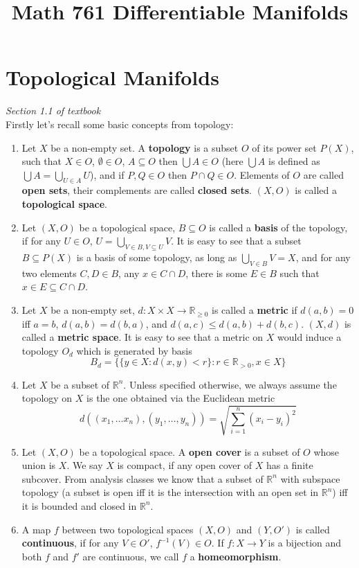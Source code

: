 \documentclass{article}
\title{Math 761 Differentiable Manifolds}
\theoremstyle{definition}
\begin{document}
\maketitle

\tableofcontents

\newpage

\section{Topological Manifolds}

{\em Section 1.1 of textbook}\\

Firstly let's recall some basic concepts from topology:

\begin{enumerate}
    \item Let $X$ be a non-empty set. A {\bf topology} is a subset $O$ of its power set $P(X)$, such that $X\in O$, $\emptyset\in O$, $A\subseteq O$ then $\bigcup A\in O$ (here $\bigcup A$ is defined as $\bigcup A=\bigcup_{U\in A}U$), and if $P, Q\in O$ then $P\cap Q\in O$. Elements of $O$ are called {\bf open sets}, their complements are called {\bf closed sets}. $(X, O)$ is called a {\bf topological space}.
    \item Let $(X, O)$ be a topological space, $B\subseteq O$ is called a {\bf basis} of the topology, if for any $U\in O$, $U=\bigcup_{V\in B, V\subseteq U}V$. It is easy to see that a subset $B\subseteq P(X)$ is a basis of some topology, as long as $\bigcup_{V\in B}V=X$, and for any two elements $C, D\in B$, any $x\in C\cap D$, there is some $E\in B$ such that $x\in E\subseteq C\cap D$.
    \item Let $X$ be a non-empty set, $d: X\times X\rightarrow \mathbb{R}_{\geq 0}$ is called a {\bf metric} if $d(a, b)=0$ iff $a=b$, $d(a, b)=d(b, a)$, and $d(a, c)\leq d(a, b)+d(b, c)$. $(X, d)$ is called a {\bf metric space}. It is easy to see that a metric on $X$ would induce a topology $O_d$ which is generated by basis 
    \[B_d=\{\{y\in X: d(x, y)<r\}: r\in\mathbb{R}_{>0}, x\in X\}\] 
    \item Let $X$ be a subset of $\mathbb{R}^n$. Unless specified otherwise, we always assume the topology on $X$ is the one obtained via the Euclidean metric 
    \[d((x_1, \dots x_n), (y_1, \dots, y_n))=\sqrt{\sum_{i=1}^n (x_i-y_i)^2}\]
    \item Let $(X, O)$ be a topological space. A {\bf open cover} is a subset of $O$ whose union is $X$. We say $X$ is compact, if any open cover of $X$ has a finite subcover. From analysis classes we know that a subset of $\mathbb{R}^n$ with subspace topology (a subset is open iff it is the intersection with an open set in $\mathbb{R}^n$) iff it is bounded and closed in $\mathbb{R}^n$.
    \item A map $f$ between two topological spaces $(X, O)$ and $(Y, O')$ is called {\bf continuous}, if for any $V\in O'$, $f^{-1}(V)\in O$. If $f: X\rightarrow Y$ is a bijection and both $f$ and $f'$ are continuous, we call $f$ a {\bf homeomorphism}.
\end{enumerate}
\end{document}
